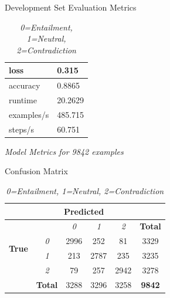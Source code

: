 \documentclass[twocolumn]{article}
\begin{document}
\begin{table}[]
\caption{Development Set Evaluation Metrics}
\centering
\begin{tabular}{|l|l|}
\hline
loss       & 0.315   \\ \hline
accuracy   & 0.8865  \\ \hline
runtime    & 20.2629 \\ \hline
examples/s & 485.715 \\ \hline
steps/s    & 60.751  \\ \hline
\end{tabular}
\caption*{\textit{Model Metrics for 9842 examples}}

\caption{Confusion Matrix}
\begin{tabular}{|c|cccc|c|}
\hline
\multicolumn{1}{|l|}{}         & \multicolumn{4}{c|}{\textbf{Predicted}}                                                                              & \multicolumn{1}{l|}{} \\ \hline
\multirow{4}{*}{\textbf{True}} & \multicolumn{1}{l|}{}               & \multicolumn{1}{c|}{\textit{0}} & \multicolumn{1}{c|}{\textit{1}} & \textit{2} & \textbf{Total}        \\ \cline{2-6} 
                               & \multicolumn{1}{c|}{\textit{0}}     & \multicolumn{1}{c|}{2996}       & \multicolumn{1}{c|}{252}        & 81         & 3329                  \\ \cline{2-6} 
                               & \multicolumn{1}{c|}{\textit{1}}     & \multicolumn{1}{c|}{213}        & \multicolumn{1}{c|}{2787}       & 235        & 3235                  \\ \cline{2-6} 
                               & \multicolumn{1}{c|}{\textit{2}}     & \multicolumn{1}{c|}{79}         & \multicolumn{1}{c|}{257}        & 2942       & 3278                  \\ \hline
\multicolumn{1}{|l|}{}         & \multicolumn{1}{c|}{\textbf{Total}} & \multicolumn{1}{c|}{3288}       & \multicolumn{1}{c|}{3296}       & 3258       & \textbf{9842}         \\ \hline
\end{tabular}
\caption*{\textit{ 0=Entailment, 1=Neutral, 2=Contradiction }}


\end{table}
\end{document}
